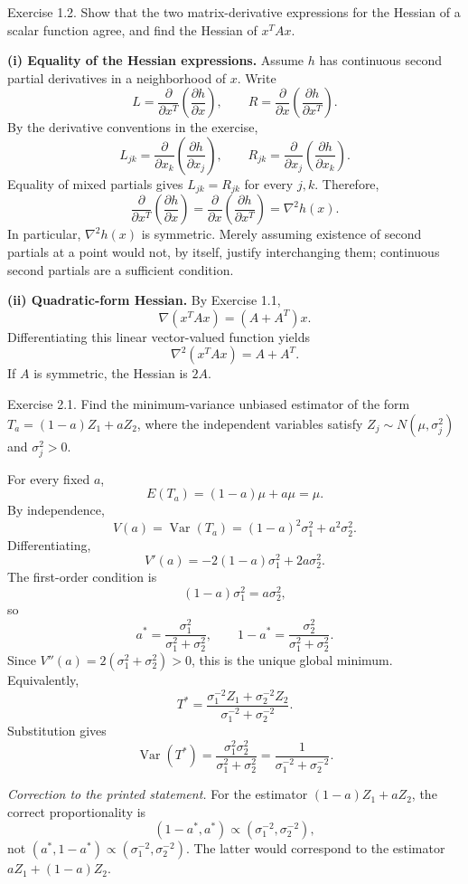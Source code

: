 \documentclass[answers,12pt,addpoints]{exam}
\begin{document}
\begin{questions}
\question Exercise 1.2. Show that the two matrix-derivative expressions
for the Hessian of a scalar function agree, and find the Hessian of $x^TAx$.
\begin{solution}
\textbf{(i) Equality of the Hessian expressions.}
Assume $h$ has continuous second partial derivatives in a neighborhood of $x$.
Write
\[
L=\frac{\partial}{\partial x^T}\left(\frac{\partial h}{\partial x}\right),
\qquad
R=\frac{\partial}{\partial x}\left(\frac{\partial h}{\partial x^T}\right).
\]
By the derivative conventions in the exercise,
\[
L_{jk}=\frac{\partial}{\partial x_k}
\left(\frac{\partial h}{\partial x_j}\right),
\qquad
R_{jk}=\frac{\partial}{\partial x_j}
\left(\frac{\partial h}{\partial x_k}\right).
\]
Equality of mixed partials gives $L_{jk}=R_{jk}$ for every $j,k$.
Therefore,
\[
\boxed{
\frac{\partial}{\partial x^T}\left(\frac{\partial h}{\partial x}\right)
=\frac{\partial}{\partial x}\left(\frac{\partial h}{\partial x^T}\right)
=\nabla^2h(x).}
\]
In particular, $\nabla^2h(x)$ is symmetric. Merely assuming existence of
second partials at a point would not, by itself, justify interchanging them;
continuous second partials are a sufficient condition.

\textbf{(ii) Quadratic-form Hessian.}
By Exercise 1.1,
\[
\nabla(x^TAx)=(A+A^T)x.
\]
Differentiating this linear vector-valued function yields
\[
\boxed{\nabla^2(x^TAx)=A+A^T.}
\]
If $A$ is symmetric, the Hessian is $2A$.
\end{solution}

\question Exercise 2.1. Find the minimum-variance unbiased estimator
of the form $T_a=(1-a)Z_1+aZ_2$, where the independent variables satisfy
$Z_j\sim N(\mu,\sigma_j^2)$ and $\sigma_j^2>0$.
\begin{solution}
For every fixed $a$,
\[
E(T_a)=(1-a)\mu+a\mu=\mu.
\]
By independence,
\[
V(a)=\operatorname{Var}(T_a)
=(1-a)^2\sigma_1^2+a^2\sigma_2^2.
\]
Differentiating,
\[
V'(a)=-2(1-a)\sigma_1^2+2a\sigma_2^2.
\]
The first-order condition is
\[
(1-a)\sigma_1^2=a\sigma_2^2,
\]
so
\[
\boxed{a^*=\frac{\sigma_1^2}{\sigma_1^2+\sigma_2^2},\qquad
1-a^*=\frac{\sigma_2^2}{\sigma_1^2+\sigma_2^2}.}
\]
Since $V''(a)=2(\sigma_1^2+\sigma_2^2)>0$, this is the unique global minimum.
Equivalently,
\[
\boxed{T^*=\frac{\sigma_1^{-2}Z_1+\sigma_2^{-2}Z_2}
{\sigma_1^{-2}+\sigma_2^{-2}}.}
\]
Substitution gives
\[
\boxed{\operatorname{Var}(T^*)
=\frac{\sigma_1^2\sigma_2^2}{\sigma_1^2+\sigma_2^2}
=\frac{1}{\sigma_1^{-2}+\sigma_2^{-2}}.}
\]

\emph{Correction to the printed statement.}
For the estimator $(1-a)Z_1+aZ_2$, the correct proportionality is
\[
(1-a^*,a^*)\propto(\sigma_1^{-2},\sigma_2^{-2}),
\]
not $(a^*,1-a^*)\propto(\sigma_1^{-2},\sigma_2^{-2})$.
The latter would correspond to the estimator $aZ_1+(1-a)Z_2$.


\end{solution}
\end{questions}
\end{document}
